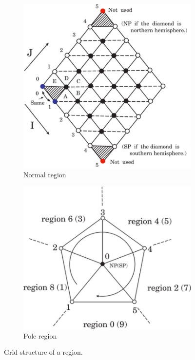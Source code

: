 \begin{figure}[htb]
 \begin{subfigure}[t]{.45\textwidth}
  \centering
  \includegraphics[width=\textwidth]{figs/Tomita_etal_2008_SIAM-9-0.png}
  \caption{Normal region}\label{f:normal_region}
 \end{subfigure}
 \begin{subfigure}[t]{.45\textwidth}
  \includegraphics[width=\textwidth]{figs/Tomita_etal_2008_SIAM-9-1.png}
  \caption{Pole region}\label{f:pole_region}
 \end{subfigure}
\caption{Grid structure of a region.\citep{Tomita:2008jc}}
\label{f:grid_structure_of_a_region}
\end{figure}



